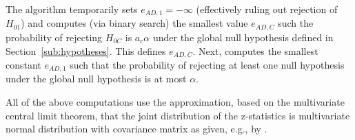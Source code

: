 \documentclass[article]{jss}
\begin{document}
The algorithm temporarily sets $e_{AD,1}= -\infty$ (effectively ruling out rejection of $H_{01}$)
and computes (via binary search) the smallest value $e_{AD,C}$ such the probability of rejecting $H_{0C}$ is $a_c α$ under the global null hypothesis defined in Section~\ref{sub:hypotheses}. This defines $e_{AD,C}$. 
Next,   computes the smallest constant $e_{AD,1}$ such that the probability of rejecting at least one null hypothesis under the global null hypothesis  is at most $\alpha$. %

All of the above computations use the approximation, based on the multivariate central limit theorem, that the joint distribution of the  z-statistics is multivariate normal distribution with covariance matrix as given, e.g., by \cite{JennisonTurnbullBook,Rosenblum2013AdaptMISTIE}.


\end{document}
